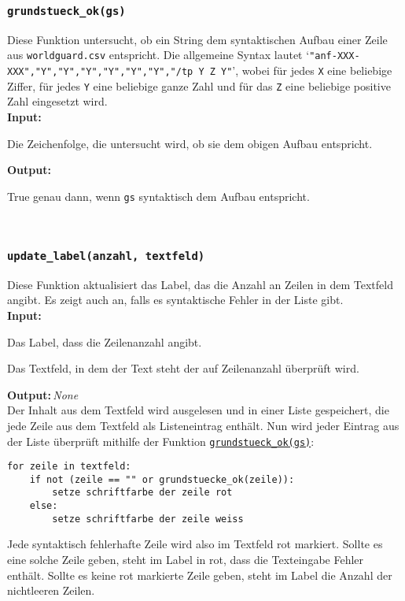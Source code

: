 \documentclass{article}
\newcommand{\initem}[2]{\item[\hspace{0.5em} {\normalfont\ttfamily{#1}} {\normalfont\itshape{(#2)}}]}
\newcommand{\bfpara}[1]{\noindent \textbf{#1:}\,}
\begin{document}
\subsubsection*{\texttt{grundstueck\_ok(gs)}}\label{subsubsec:grundstueck_ok}
Diese Funktion untersucht, ob ein String dem syntaktischen Aufbau einer Zeile aus \texttt{worldguard.csv} entspricht. Die allgemeine Syntax lautet `\texttt{"{}anf-XXX-XXX","Y","Y","Y","Y","Y","Y","{}/tp Y Z Y"}', wobei f\"ur jedes \texttt{X} eine beliebige Ziffer, f\"ur jedes \texttt{Y} eine beliebige ganze Zahl und f\"ur das \texttt{Z} eine beliebige positive Zahl eingesetzt wird.\\

\bfpara{Input}
\begin{compactdesc}
	\initem{gs}{str} Die Zeichenfolge, die untersucht wird, ob sie dem obigen Aufbau entspricht.
\end{compactdesc}
\bfpara{Output}
\begin{compactdesc}
	\initem{}{bool} True genau dann, wenn \texttt{gs} syntaktisch dem Aufbau entspricht.
\end{compactdesc}
\leavevmode\\[11pt]

\subsubsection*{\texttt{update\_label(anzahl, textfeld)}}\label{subsubsec:update_label}
Diese Funktion aktualisiert das Label, das die Anzahl an Zeilen in dem Textfeld angibt. Es zeigt auch an, falls es syntaktische Fehler in der Liste gibt.\\

\bfpara{Input}
\begin{compactdesc}
	\initem{anzahl}{tkinter.Label} Das Label, dass die Zeilenanzahl angibt.
	\initem{textfeld}{tkinter.Text} Das Textfeld, in dem der Text steht der auf Zeilenanzahl \"uberpr\"uft wird.
\end{compactdesc}
\bfpara{Output}{\textit{None}}\\

Der Inhalt aus dem Textfeld wird ausgelesen und in einer Liste gespeichert, die jede Zeile aus dem Textfeld als Listeneintrag enth\"alt. Nun wird jeder Eintrag aus der Liste \"uberpr\"uft mithilfe der Funktion \hyperref[subsubsec:grundstueck_ok]{\texttt{grundstueck\_ok(gs)}}:
\begin{lstlisting}
for zeile in textfeld:
    if not (zeile == "" or grundstuecke_ok(zeile)):
        setze schriftfarbe der zeile rot
    else:
        setze schriftfarbe der zeile weiss
\end{lstlisting}
Jede syntaktisch fehlerhafte Zeile wird also im Textfeld rot markiert. Sollte es eine solche Zeile geben, steht im Label in rot, dass die Texteingabe Fehler enth\"alt. Sollte es keine rot markierte Zeile geben, steht im Label die Anzahl der nichtleeren Zeilen.\\[11pt]
\end{document}
